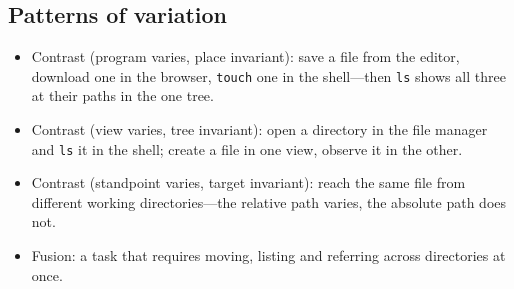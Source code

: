 \subsection{Patterns of variation}

\begin{itemize}
  \item Contrast (program varies, place invariant): save a file from the
    editor, download one in the browser, \texttt{touch} one in the
    shell---then \texttt{ls} shows all three at their paths in the one
    tree.
  \item Contrast (view varies, tree invariant): open a directory in the
    file manager and \texttt{ls} it in the shell; create a file in one
    view, observe it in the other.
  \item Contrast (standpoint varies, target invariant): reach the same
    file from different working directories---the relative path varies,
    the absolute path does not.
  \item Fusion: a task that requires moving, listing and referring across
    directories at once.
\end{itemize}
